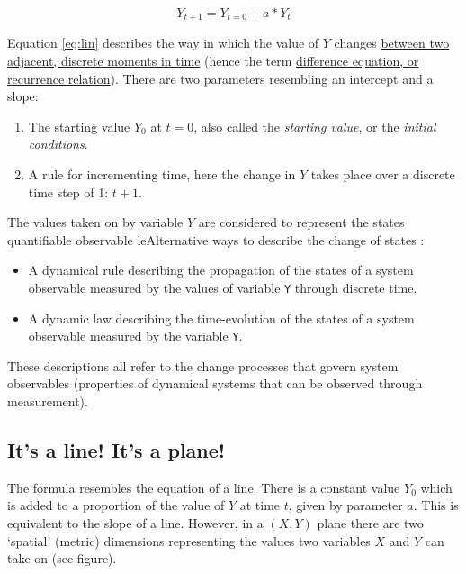 \documentclass[]{book}
\providecommand{\tightlist}{%
  \setlength{\itemsep}{0pt}\setlength{\parskip}{0pt}}
\begin{document}
\begin{equation}
Y_{t+1} = Y_{t=0} + a*Y_t
\label{eq:lin}
\end{equation}

Equation \eqref{eq:lin} describes the way in which the value of \(Y\)
changes
\href{https://en.wikipedia.org/wiki/Discrete_time_and_continuous_time}{between
two adjacent, discrete moments in time} (hence the term
\href{https://en.wikipedia.org/wiki/Recurrence_relation}{difference
equation, or recurrence relation}). There are two parameters resembling
an intercept and a slope:

\begin{enumerate}
\def\labelenumi{\arabic{enumi}.}
\tightlist
\item
  The starting value \(Y_0\) at \(t=0\), also called the \emph{starting
  value}, or the \emph{initial conditions}.
\item
  A rule for incrementing time, here the change in \(Y\) takes place
  over a discrete time step of 1: \(t+1\).
\end{enumerate}

The values taken on by variable \(Y\) are considered to represent the
states quantifiable observable leAlternative ways to describe the change
of states :

\begin{itemize}
\tightlist
\item
  A dynamical rule describing the propagation of the states of a system
  observable measured by the values of variable \texttt{Y} through
  discrete time.
\item
  A dynamic law describing the time-evolution of the states of a system
  observable measured by the variable \texttt{Y}.
\end{itemize}

These descriptions all refer to the change processes that govern system
observables (properties of dynamical systems that can be observed
through measurement).

\subsection*{\texorpdfstring{\textbf{It's a line! It's a
plane!}}{It's a line! It's a plane!}}\label{its-a-line-its-a-plane}

The formula resembles the equation of a line. There is a constant value
\(Y_{0}\) which is added to a proportion of the value of \(Y\) at time
\(t\), given by parameter \(a\). This is equivalent to the slope of a
line. However, in a \((X,Y)\) plane there are two `spatial' (metric)
dimensions representing the values two variables \(X\) and \(Y\) can
take on (see figure).
\end{document}
